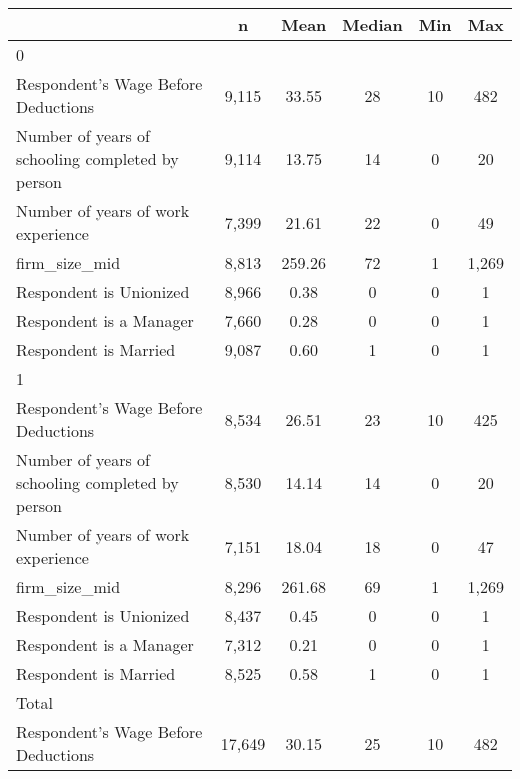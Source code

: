 {
\def\sym#1{\ifmmode^{#1}\else\(^{#1}\)\fi}
\begin{tabular}{l*{1}{ccccc}}
\toprule
                    &           n&        Mean&      Median&         Min&         Max\\
\midrule
0                   &            &            &            &            &            \\
Respondent's Wage Before Deductions&       9,115&       33.55&          28&          10&         482\\
Number of years of schooling completed by person&       9,114&       13.75&          14&           0&          20\\
Number of years of work experience&       7,399&       21.61&          22&           0&          49\\
firm\_size\_mid       &       8,813&      259.26&          72&           1&       1,269\\
Respondent is Unionized&       8,966&        0.38&           0&           0&           1\\
Respondent is a Manager&       7,660&        0.28&           0&           0&           1\\
Respondent is Married&       9,087&        0.60&           1&           0&           1\\
\midrule
1                   &            &            &            &            &            \\
Respondent's Wage Before Deductions&       8,534&       26.51&          23&          10&         425\\
Number of years of schooling completed by person&       8,530&       14.14&          14&           0&          20\\
Number of years of work experience&       7,151&       18.04&          18&           0&          47\\
firm\_size\_mid       &       8,296&      261.68&          69&           1&       1,269\\
Respondent is Unionized&       8,437&        0.45&           0&           0&           1\\
Respondent is a Manager&       7,312&        0.21&           0&           0&           1\\
Respondent is Married&       8,525&        0.58&           1&           0&           1\\
\midrule
Total               &            &            &            &            &            \\
Respondent's Wage Before Deductions&      17,649&       30.15&          25&          10&         482\\

\end{tabular}}
